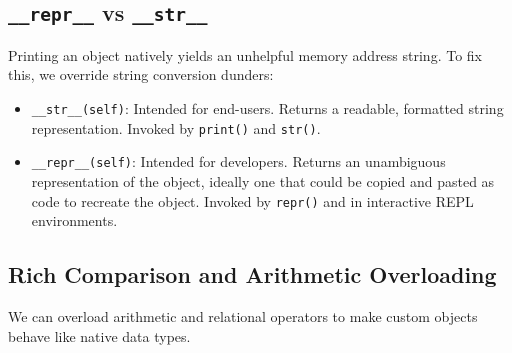 \subsection{\texttt{\_\_repr\_\_} vs \texttt{\_\_str\_\_}}
Printing an object natively yields an unhelpful memory address string. To fix this, we override string conversion dunders:
\begin{itemize}
    \item \texttt{\_\_str\_\_(self)}: Intended for end-users. Returns a readable, formatted string representation. Invoked by \texttt{print()} and \texttt{str()}.
    \item \texttt{\_\_repr\_\_(self)}: Intended for developers. Returns an unambiguous representation of the object, ideally one that could be copied and pasted as code to recreate the object. Invoked by \texttt{repr()} and in interactive REPL environments.
\end{itemize}



\subsection{Rich Comparison and Arithmetic Overloading}

We can overload arithmetic and relational operators to make custom objects behave like native data types.

